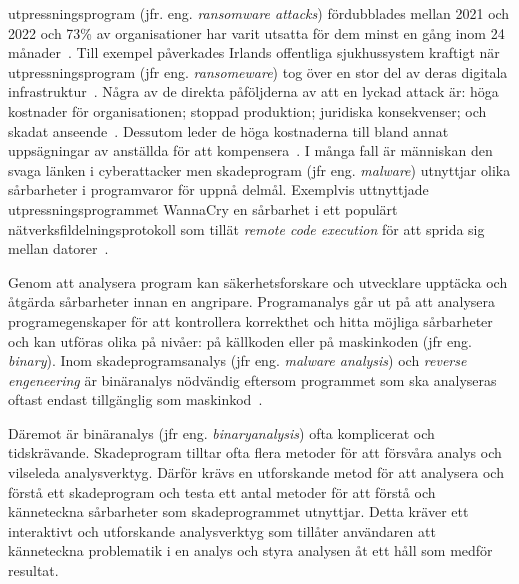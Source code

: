 utpressningsprogram (jfr. eng. \emph{ransomware attacks}) fördubblades
mellan 2021 och 2022 och 73\% av organisationer har varit utsatta för dem
minst en gång inom 24 månader~\cite{cyberreason2021,
    cyberreason2022}. Till exempel påverkades Irlands offentliga sjukhussystem
kraftigt när utpressningsprogram (jfr eng. \emph{ransomeware}) tog över en stor del av deras digitala
infrastruktur~\cite{hse_report, gallagher2023}. Några av de direkta påföljderna
av att en lyckad attack är: höga kostnader för organisationen; stoppad
produktion; juridiska konsekvenser; och skadat
anseende~\cite{cyberreason2021, cyberreason2022}. Dessutom leder de höga
kostnaderna till bland annat uppsägningar av anställda för att
kompensera~\cite{cyberreason2021, cyberreason2022}. I många fall är människan
den svaga länken i cyberattacker men skadeprogram (jfr eng.
\emph{malware}) utnyttjar olika sårbarheter i programvaror för uppnå delmål.
Exemplvis uttnyttjade utpressningsprogrammet WannaCry en
sårbarhet i ett populärt nätverksfildelningsprotokoll som tillät \emph{remote
    code execution} för att sprida sig mellan
datorer~\cite{alraddadicomprehensive}.

Genom att analysera program kan säkerhetsforskare och utvecklare upptäcka och
åtgärda sårbarheter innan en angripare. Programanalys går ut på att analysera
programegenskaper för att kontrollera korrekthet och hitta möjliga sårbarheter
och kan utföras olika på nivåer: på källkoden eller på maskinkoden (jfr eng.
\emph{binary}). Inom skadeprogramsanalys (jfr eng. \emph{malware analysis}) och
\emph{reverse engeneering} är binäranalys nödvändig eftersom programmet som ska
analyseras oftast endast tillgänglig som maskinkod~\cite{andriesse2018}.


Däremot är binäranalys (jfr eng. \emph{binaryanalysis}) ofta komplicerat och
tidskrävande. Skadeprogram tilltar ofta flera metoder för att försvåra
analys och vilseleda analysverktyg. Därför krävs en utforskande metod för att
analysera och förstå ett skadeprogram och testa ett antal metoder för att förstå
och känneteckna sårbarheter som skadeprogrammet utnyttjar. Detta kräver ett
interaktivt och utforskande analysverktyg som tillåter användaren att
känneteckna problematik i en analys och styra analysen åt ett håll som medför
resultat.

